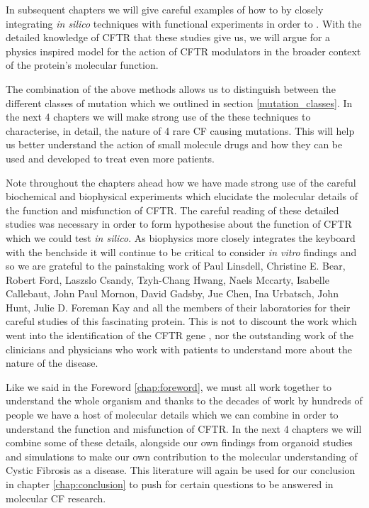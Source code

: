 In subsequent chapters we will give careful examples of how to by closely integrating \textit{in silico} techniques with functional experiments in order to . With the detailed knowledge of CFTR that these studies give us, we will argue for a physics inspired model for the action of CFTR modulators in the broader context of the protein's molecular function. 

The combination of the above methods allows us to distinguish between the different classes of mutation which we outlined in section \ref{mutation_classes}. In the next 4 chapters we will make strong use of the these techniques to characterise, in detail, the nature of 4 rare CF causing mutations. This will help us better understand the action of small molecule drugs and how they can be used and developed to treat even more patients.

Note throughout the chapters ahead how we have made strong use of the careful biochemical and biophysical experiments which elucidate the molecular details of the function and misfunction of CFTR. The careful reading of these detailed studies was necessary in order to form hypothesise about the function of CFTR which we could test \textit {in silico}. As biophysics more closely integrates the keyboard with the benchside it will continue to be critical to consider \textit{in vitro} findings and so we are grateful to the painstaking work of Paul Linsdell, Christine E. Bear, Robert Ford, Laszslo Csandy, Tzyh-Chang Hwang, Naels Mccarty, Isabelle Callebaut, John Paul Mornon, David Gadsby, Jue Chen, Ina Urbatsch, John Hunt, Julie D. Foreman Kay and all the members of their laboratories for their careful studies of this fascinating protein. This is not to discount the work which went into the identification of the CFTR gene \cite{riordan1989}, nor the outstanding work of the clinicians and physicians who work with patients to understand more about the nature of the disease.  

Like we said in the Foreword \ref{chap:foreword}, we must all work together to understand the whole organism and thanks to the decades of work by hundreds of people we have a host of molecular details which we can combine in order to understand the function and misfunction of CFTR. In the next 4 chapters we will combine some of these details, alongside our own findings from organoid studies and simulations to make our own contribution to the molecular understanding of Cystic Fibrosis as a disease. This literature will again be used for our conclusion in chapter \ref{chap:conclusion} to push for certain questions to be answered in molecular CF research.

